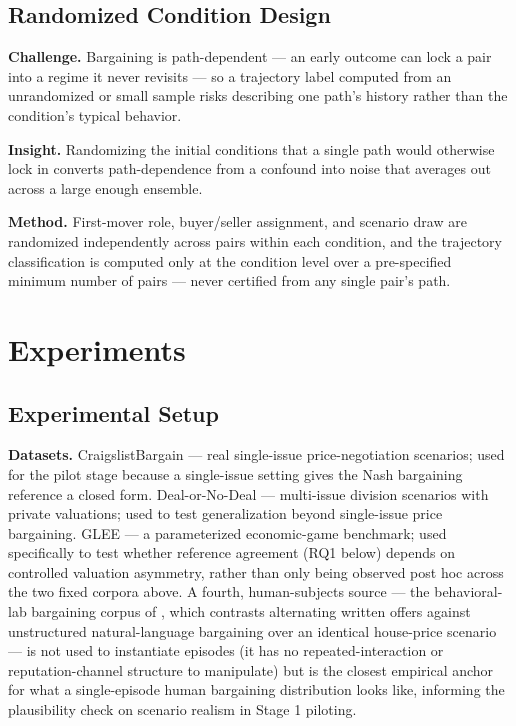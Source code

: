 \documentclass[11pt]{article}
\begin{document}
\subsection{Randomized Condition Design}
\textbf{Challenge.} Bargaining is path-dependent --- an early outcome can lock a pair into a regime it never revisits --- so a trajectory label computed from an unrandomized or small sample risks describing one path's history rather than the condition's typical behavior.

\textbf{Insight.} Randomizing the initial conditions that a single path would otherwise lock in converts path-dependence from a confound into noise that averages out across a large enough ensemble.

\textbf{Method.} First-mover role, buyer/seller assignment, and scenario draw are randomized independently across pairs within each condition, and the trajectory classification is computed only at the condition level over a pre-specified minimum number of pairs --- never certified from any single pair's path.

\section{Experiments}

\subsection{Experimental Setup}

\textbf{Datasets.} CraigslistBargain \citep{he2018} --- real single-issue price-negotiation scenarios; used for the pilot stage because a single-issue setting gives the Nash bargaining reference a closed form. Deal-or-No-Deal \citep{lewis2017} --- multi-issue division scenarios with private valuations; used to test generalization beyond single-issue price bargaining. GLEE \citep{shapira2024glee} --- a parameterized economic-game benchmark; used specifically to test whether reference agreement (RQ1 below) depends on controlled valuation asymmetry, rather than only being observed post hoc across the two fixed corpora above. A fourth, human-subjects source --- the behavioral-lab bargaining corpus of \citet{heddaya2023}, which contrasts alternating written offers against unstructured natural-language bargaining over an identical house-price scenario --- is not used to instantiate episodes (it has no repeated-interaction or reputation-channel structure to manipulate) but is the closest empirical anchor for what a single-episode human bargaining distribution looks like, informing the plausibility check on scenario realism in Stage 1 piloting.
\end{document}
